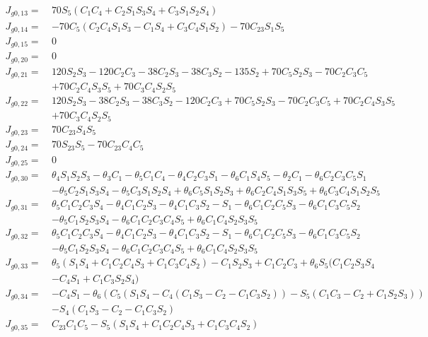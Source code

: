 \documentclass[12pt]{article}
\begin{document}
\begin{CJK}{UTF8}{bsmi}
\begin{equation*}
\begin{split}
J_{g0,13} =\  &70S_5(C_1C_4 + C_2S_1S_3S_4 + C_3S_1S_2S_4)\\
J_{g0,14} =\  &- 70C_5(C_2C_4S_1S_3 - C_1S_4 + C_3C_4S_1S_2) - 70C_{23}S_1S_5\\
J_{g0,15} =\  &0\\
J_{g0,20} =\  &0\\
J_{g0,21} =\  &120S_2S_3 - 120C_2C_3 - 38C_2S_3 - 38C_3S_2 - 135S_2 + 70C_5S_2S_3 - 70C_2C_3C_5\\
		 	  &+ 70C_2C_4S_3S_5 + 70C_3C_4S_2S_5\\
J_{g0,22} =\  &120S_2S_3 - 38C_2S_3 - 38C_3S_2 - 120C_2C_3 + 70C_5S_2S_3 - 70C_2C_3C_5 + 70C_2C_4S_3S_5\\
		 	  &+ 70C_3C_4S_2S_5\\
J_{g0,23} =\  &70C_{23}S_4S_5\\
J_{g0,24} =\  &70S_{23}S_5 - 70C_{23}C_4C_5\\
J_{g0,25} =\  &0\\
J_{g0,30} =\  &\theta _4S_1S_2S_3 - \theta _3C_1 - \theta _5C_1C_4 - \theta _4C_2C_3S_1 - \theta _6C_1S_4S_5 - \theta _2C_1 - \theta _6C_2C_3C_5S_1\\
		 	  &- \theta _5C_2S_1S_3S_4 - \theta _5C_3S_1S_2S_4 + \theta _6C_5S_1S_2S_3 + \theta _6C_2C_4S_1S_3S_5 + \theta _6C_3C_4S_1S_2S_5\\
J_{g0,31} =\  &\theta _5C_1C_2C_3S_4 - \theta _4C_1C_2S_3 - \theta _4C_1C_3S_2 - S_1 - \theta _6C_1C_2C_5S_3 - \theta _6C_1C_3C_5S_2\\
		 	  &- \theta _5C_1S_2S_3S_4 - \theta _6C_1C_2C_3C_4S_5 + \theta _6C_1C_4S_2S_3S_5\\
J_{g0,32} =\  &\theta _5C_1C_2C_3S_4 - \theta _4C_1C_2S_3 - \theta _4C_1C_3S_2 - S_1 - \theta _6C_1C_2C_5S_3 - \theta _6C_1C_3C_5S_2\\
			  &- \theta _5C_1S_2S_3S_4 - \theta _6C_1C_2C_3C_4S_5 + \theta _6C_1C_4S_2S_3S_5\\
J_{g0,33} =\  &\theta _5(S_1S_4 + C_1C_2C_4S_3 + C_1C_3C_4S_2) - C_1S_2S_3 + C_1C_2C_3 + \theta _6S_5(C_1C_2S_3S_4\\
			  &- C_4S_1 + C_1C_3S_2S_4)\\
J_{g0,34} =\  &- C_4S_1 - \theta _6(C_5(S_1S_4 - C_4(C_1S_3-C_2 - C_1C_3S_2)) - S_5(C_1C_3-C_2 + C_1S_2S_3))\\
			  &- S_4(C_1S_3-C_2 - C_1C_3S_2)\\
J_{g0,35} =\  &C_{23}C_1C_5 - S_5(S_1S_4 + C_1C_2C_4S_3 + C_1C_3C_4S_2)\\
\end{split}
\end{equation*}

\end{CJK}
\end{document}
